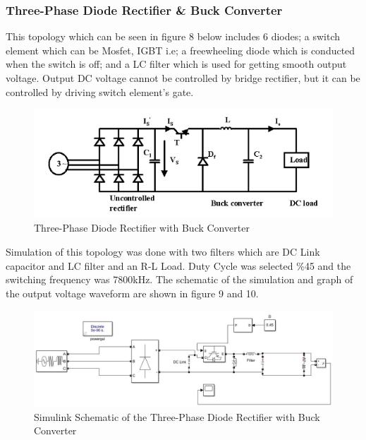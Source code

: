 \documentclass{article}
\begin{document}
\subsubsection{Three-Phase Diode Rectifier \& Buck Converter}%
This topology which can be seen in figure 8 below includes 6 diodes; a switch element which can be Mosfet, IGBT i.e; a freewheeling diode which is conducted when the switch is off; and a LC filter which is used for getting smooth output voltage. Output DC voltage cannot be controlled by bridge rectifier, but it can be controlled by driving switch element’s gate.
\begin{figure}[h!]
\centering
\includegraphics[scale=0.7]{ucfazdiodetopo}
\caption{Three-Phase Diode Rectifier with Buck Converter}
\label{fig:members}
\end{figure} 

\par Simulation of this topology was done with two filters which are DC Link capacitor and LC filter and an R-L Load. Duty Cycle was selected \%45 and the switching frequency was 7800kHz. The schematic of the simulation and graph of the output voltage waveform are shown in figure 9 and 10.
\begin{figure}[h!]
\centering
\includegraphics[scale=0.3]{furkancct}
\caption{Simulink Schematic of the Three-Phase Diode Rectifier with Buck Converter}
\label{fig:members}
\end{figure}
\end{document}
